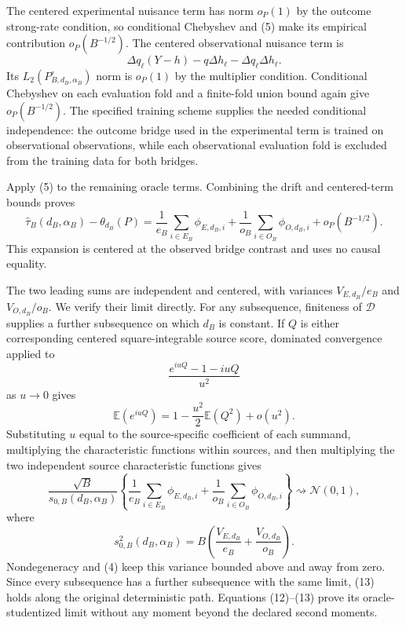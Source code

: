 The centered experimental nuisance term has norm \(o_P(1)\) by the outcome strong-rate condition, so conditional Chebyshev and (5) make its empirical contribution \(o_P(B^{-1/2})\).  The centered observational nuisance term is
\[
 \Delta q_\ell(Y-h)-q\Delta h_\ell-\Delta q_\ell\Delta h_\ell. \tag{11}
\]
Its \(L_2(P_{B,d_B,\alpha_B}^{\circ})\) norm is \(o_P(1)\) by the multiplier condition.  Conditional Chebyshev on each evaluation fold and a finite-fold union bound again give \(o_P(B^{-1/2})\).  The specified training scheme supplies the needed conditional independence: the outcome bridge used in the experimental term is trained on observational observations, while each observational evaluation fold is excluded from the training data for both bridges.

Apply (5) to the remaining oracle terms.  Combining the drift and centered-term bounds proves
\[
 \widehat\tau_B(d_B,\alpha_B)-\theta_{d_B}(P)
 =\frac1{e_B}\sum_{i\in E_B}\phi_{E,d_B,i}
 +\frac1{o_B}\sum_{i\in O_B}\phi_{O,d_B,i}
 +o_P(B^{-1/2}).                                         \tag{12}
\]
This expansion is centered at the observed bridge contrast and uses no causal equality.

The two leading sums are independent and centered, with variances \(V_{E,d_B}/e_B\) and \(V_{O,d_B}/o_B\).  We verify their limit directly.  For any subsequence, finiteness of \(\mathcal D\) supplies a further subsequence on which \(d_B\) is constant.  If \(Q\) is either corresponding centered square-integrable source score, dominated convergence applied to
\[
 \frac{e^{iuQ}-1-iuQ}{u^2}
\]
as \(u\to0\) gives
\[
 \mathbb E(e^{iuQ})=1-\frac{u^2}{2}\mathbb E(Q^2)+o(u^2).
\]
Substituting \(u\) equal to the source-specific coefficient of each summand, multiplying the characteristic functions within sources, and then multiplying the two independent source characteristic functions gives
\[
 \frac{\sqrt B}{s_{0,B}(d_B,\alpha_B)}
 \left\{
 \frac1{e_B}\sum_{i\in E_B}\phi_{E,d_B,i}
 +\frac1{o_B}\sum_{i\in O_B}\phi_{O,d_B,i}
 \right\}
 \rightsquigarrow\mathcal N(0,1),                       \tag{13}
\]
where
\[
 s_{0,B}^2(d_B,\alpha_B)
 =B\left(\frac{V_{E,d_B}}{e_B}+\frac{V_{O,d_B}}{o_B}\right).
\]
Nondegeneracy and (4) keep this variance bounded above and away from zero.  Since every subsequence has a further subsequence with the same limit, (13) holds along the original deterministic path.  Equations (12)--(13) prove its oracle-studentized limit without any moment beyond the declared second moments.

